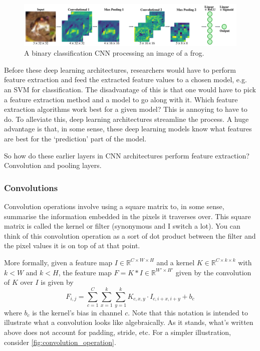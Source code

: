 \documentclass[11pt]{article}
\begin{document}
\begin{figure}[ht]
    \centering
    \includegraphics[width=1\textwidth]{./figures/neural_nets/CNN_frog.pdf}
    \caption{\centering A binary classification CNN processing an image of a frog.}
    \label{fig:CNN_frog}
\end{figure}

\noindent Before these deep learning architectures, researchers would have to perform feature extraction and feed the extracted feature values to a chosen model, e.g. an SVM for classification. The disadvantage of this is that one would have to pick a feature extraction method and a model to go along with it. Which feature extraction algorithms work best for a given model? This is annoying to have to do. To alleviate this, deep learning architectures streamline the process. A huge advantage is that, in some sense, these deep learning models know what features are best for the `prediction' part of the model.

So how do these earlier layers in CNN architectures perform feature extraction? Convolution and pooling layers.

\subsubsection{Convolutions}
Convolution operations involve using a square matrix to, in some sense, summarise the information embedded in the pixels it traverses over. This square matrix is called the kernel or filter (synonymous and I switch a lot). You can think of this convolution operation as a sort of dot product between the filter and the pixel values it is on top of at that point.

More formally, given a feature map $I\in\mathbb{R}^{C\times W\times H}$ and a kernel $K\in\mathbb{R}^{C\times k\times k}$ with $k<W$ and $k<H$, the feature map $F=K*I\in\mathbb{R}^{W'\times H'}$ given by the convolution of $K$ over $I$ is given by
$$
F_{i,j}
=
\sum_{c=1}^C\sum_{x=1}^{k}\sum_{y=1}^{k}K_{c,x,y}\cdot I_{c,i+x,i+y}+b_c
$$
where $b_c$ is the kernel's bias in channel $c$. Note that this notation is intended to illustrate what a convolution looks like algebraically. As it stands, what's written above does not account for padding, stride, etc. For a simpler illustration, consider \autoref{fig:convolution_operation}.
\end{document}

